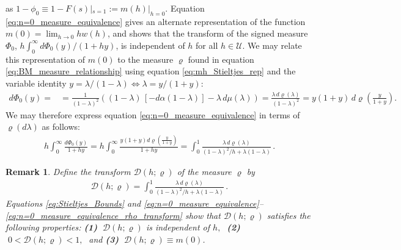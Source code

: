 \documentclass[english,12pt,jmp,graphicx]{revtex4-1}
\newtheorem{remark}{Remark}[section]
\newcommand{\ph}{\hat{\phi}}
\begin{document}
%
as $1-\phi_0\equiv1-F(s)|_{s=1}:=m(h)|_{h=0}$. Equation \eqref{eq:n=0_measure_equivalence}
gives an alternate representation of the function $m(0)=\lim_{h\to0}hw(h)$, and
shows that the transform of the signed measure \cite{Rudin:87} $\Phi_0$,
$h\int_0^\infty d\Phi_0(y)/(1+hy)$, is independent of $h$ for all $h\in\mathcal{U}$. We may 
relate this representation of $m(0)$ to the measure $\varrho$ found in
equation \eqref{eq:BM_measure_relationship} using equation
\eqref{eq:mh_Stieltjes_rep} and the variable identity $y=\lambda/(1-\lambda)\iff\lambda=y/(1+y)$:       
%
\begin{align*}%
  d\Phi_0(y)%
        =%
        &=\frac{1}{(1-\lambda)^2}((1-\lambda)\,[-d\alpha(1-\lambda)]-\lambda\,d\mu(\lambda))
        =\frac{\lambda\,d\varrho(\lambda)}{(1-\lambda)^2}=y(1+y)\,d\varrho\left(\frac{y}{1+y}\right).%
\end{align*}
%
We may therefore express equation \eqref{eq:n=0_measure_equivalence}
in terms of $\varrho(d\lambda)$ as follows: 
%
\begin{align}\label{eq:n=0_measure_equivalence_rho_transform}
   h\int_0^\infty\frac{d\Phi_0(y)}{1+hy}
      =h\int_0^\infty\frac{y(1+y)d\varrho(\frac{y}{1+y})}{1+hy}
      =\int_0^1\frac{\lambda\,d\varrho(\lambda)}{(1-\lambda)^2/h+\lambda(1-\lambda)}\,.
\end{align}
%
%
\begin{remark}\label{rem:varrho_conditions}
  Define the transform $\mathcal{D}(h;\varrho)$ of the measure $\varrho$ by
  \begin{align}\label{eq:D_varrho}
    \mathcal{D}(h;\varrho)=\int_0^1\frac{\lambda\,d\varrho(\lambda)}{(1-\lambda)^2/h+\lambda(1-\lambda)}\,.
  \end{align}
  Equations \eqref{eq:Stieltjes_Bounds} and 
  \eqref{eq:n=0_measure_equivalence}--\eqref{eq:n=0_measure_equivalence_rho_transform}
  show that $\mathcal{D}(h;\varrho)$ satisfies the following properties:
  \newline
  \textbf{(1)} $\;\mathcal{D}(h;\varrho)$ is independent of $h,\;$ \textbf{(2)}
  $\;0<\mathcal{D}(h;\varrho)<1,\;$ and \textbf{(3)} $\;\mathcal{D}(h;\varrho)\equiv m(0)$. 
\end{remark}
\end{document}
